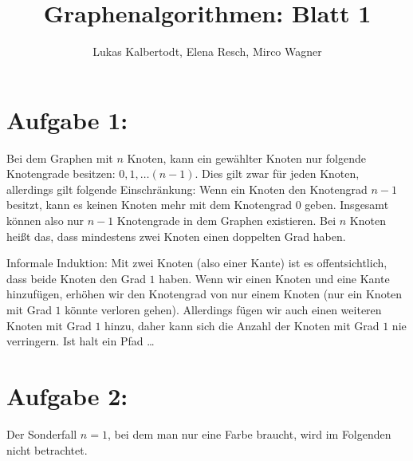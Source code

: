 \documentclass[11pt]{scrartcl}  %
\title{Graphenalgorithmen: Blatt 1}
\author{Lukas Kalbertodt, Elena Resch, Mirco Wagner}
\newcommand{\subtbegin}{\begin{compactenum}[(a)]}
\newcommand{\subtend}{\end{compactenum}}
\begin{document}
\maketitle


\section*{Aufgabe 1:}

\subtbegin
  \item Bei dem Graphen mit $n$ Knoten, kann ein gewählter Knoten nur folgende Knotengrade besitzen: $0, 1, \dots (n-1)$. Dies gilt zwar für jeden Knoten, allerdings gilt folgende Einschränkung: Wenn ein Knoten den Knotengrad $n-1$ besitzt, kann es keinen Knoten mehr mit dem Knotengrad $0$ geben. Insgesamt können also nur $n-1$ Knotengrade in dem Graphen existieren. Bei $n$ Knoten heißt das, dass mindestens zwei Knoten einen doppelten Grad haben.
  \item Informale Induktion: Mit zwei Knoten (also einer Kante) ist es offentsichtlich, dass beide Knoten den Grad $1$ haben. Wenn wir einen Knoten und eine Kante hinzufügen, erhöhen wir den Knotengrad von nur einem Knoten (nur ein Knoten mit Grad $1$ könnte verloren gehen). Allerdings fügen wir auch einen weiteren Knoten mit Grad $1$ hinzu, daher kann sich die Anzahl der Knoten mit Grad $1$ nie verringern. Ist halt ein Pfad \dots
\subtend

\section*{Aufgabe 2:}

Der Sonderfall $n=1$, bei dem man nur eine Farbe braucht, wird im Folgenden nicht betrachtet.
\end{document}
